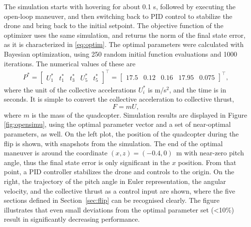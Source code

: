 The simulation starts with hovering for about 0.1 s, followed by executing the open-loop maneuver, and then switching back to PID control to stabilize the drone and bring back to the initial setpoint. The objective function of the optimizer uses the same simulation, and returns the norm of the final state error, as it is characterized in \eqref{eq:optim}. The optimal parameters were calculated with Bayesian optimization, using 250 random initial function evaluations and 1000 iterations. The numerical values of these are
\begin{align}\label{eq:optparam}
P^*=\begin{bmatrix}
U_1^* & t_1^* & t_3^* & U_5^*& t_5^*
\end{bmatrix} ^\top =  \begin{bmatrix}
17.5 & 0.12 & 0.16 & 17.95 & 0.075
\end{bmatrix}^\top,
\end{align}
where the unit of the collective accelerations $U_i^*$ is m/s$^2$, and the time is in seconds. It is simple to convert the collective acceleration to collective thrust, 
\begin{equation}
    F = m U,
\end{equation}
where $m$ is the mass of the quadcopter. Simulation results are displayed in Figure \ref{fig:opensimu}, using the optimal parameter vector and a set of near-optimal parameters, as well. On the left plot, the position of the quadcopter during the flip is shown, with snapshots from the simulation. The end of the optimal maneuver is around the coordinate $(x, z)=(-0.4, 0)$~m with near-zero pitch angle, thus the final state error is only significant in the $x$ position. From that point, a PID controller\cite{gym} stabilizes the drone and controls to the origin. On the right, the trajectory of the pitch angle in Euler representation, the angular velocity, and the collective thrust as a control input are shown, where the five sections defined in Section~\ref{sec:flip} can be recognised clearly. The figure illustrates that even small deviations from the optimal parameter set (<10\%) result in significantly decreasing performance.

